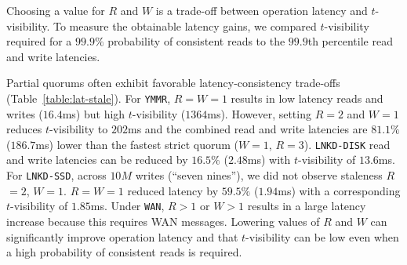 \documentclass{vldb}
\begin{document}
Choosing a value for $R$ and $W$ is a trade-off between operation
latency and $t$-visibility. To measure the obtainable latency gains,
we compared $t$-visibility required for a $99.9\%$ probability of
consistent reads to the $99.9$th percentile read and write latencies.

Partial quorums often exhibit favorable latency-consistency trade-offs
(Table~\ref{table:lat-stale}).  For \texttt{YMMR}, $R$$=$$W$$=$$1$
results in low latency reads and writes ($16.4$ms) but high
$t$-visibility ($1364$ms). However, setting $R$$=$$2$ and $W$$=$$1$
reduces $t$-visibility to $202$ms and the combined read and write
latencies are $81.1\%$ ($186.7$ms) lower than the fastest strict
quorum ($W$$=$$1$, $R$$=$$3$).  \texttt{LNKD-DISK} read and write
latencies can be reduced by $16.5\%$ ($2.48$ms) with $t$-visibility of
$13.6$ms.  For \texttt{LNKD-SSD}, across $10M$ writes (``seven
nines''), we did not observe staleness $R$$=$$2$, $W$$=$$1$.
$R$$=$$W$$=$$1$ reduced latency by $59.5\%$ ($1.94$ms) with a
corresponding $t$-visibility of $1.85$ms.  Under \texttt{WAN}, $R > 1$
or $W > 1$ results in a large latency increase because this requires
WAN messages. Lowering values of $R$ and $W$ can significantly improve
operation latency and that $t$-visibility can be low even when a high
probability of consistent reads is required.
\end{document}
